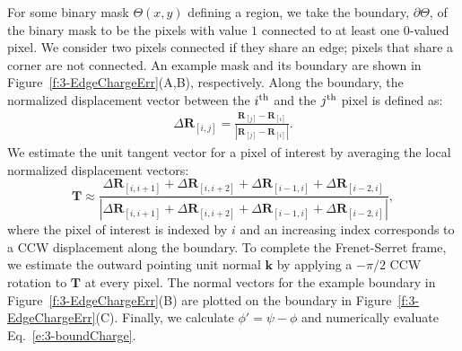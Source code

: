 For some binary mask $\Theta(x,y)$ defining a region, we take the boundary, $\partial \Theta$, of the binary mask to be the pixels with value $1$ connected to at least one $0$-valued pixel.
We consider two pixels connected if they share an edge; pixels that share a corner are not connected.
An example mask and its boundary are shown in Figure~\ref{f:3-EdgeChargeErr}(A,B), respectively.
Along the boundary, the normalized displacement vector between the $i^{\rm th}$ and the $j^{\rm th}$ pixel is defined as:
\begin{align}
  \Delta \mathbf{R}_{[i,j]} =  \frac{\mathbf{R}_{[j]}-\mathbf{R}_{[i]}}{|\mathbf{R}_{[j]}-\mathbf{R}_{[i]}|}.
\end{align}
We estimate the unit tangent vector for a pixel of interest by averaging the local normalized displacement vectors:
\begin{equation}
  \mathbf{T} \approx \frac{\Delta \mathbf{R}_{[i,i+1]} + \Delta \mathbf{R}_{[i,i+2]} + \Delta \mathbf{R}_{[i-1,i]} + \Delta \mathbf{R}_{[i-2,i]}}{|\Delta \mathbf{R}_{[i,i+1]} + \Delta \mathbf{R}_{[i,i+2]} + \Delta \mathbf{R}_{[i-1,i]} + \Delta \mathbf{R}_{[i-2,i]}|},
\end{equation}
where the pixel of interest is indexed by $i$ and an increasing index corresponds to a CCW displacement along the boundary.
To complete the Frenet-Serret frame, we estimate the outward pointing unit normal $\mathbf{k}$ by applying a $-\pi/2$ CCW rotation to $\mathbf{T}$ at every pixel.
The normal vectors for the example boundary in Figure~\ref{f:3-EdgeChargeErr}(B) are plotted on the boundary in Figure~\ref{f:3-EdgeChargeErr}(C).
Finally, we calculate $\phi' = \psi-\phi$ and numerically evaluate Eq.~\ref{e:3-boundCharge}.
